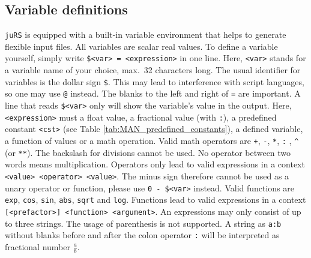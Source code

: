 \documentclass[12pt,BCOR8mm,noappendixprefix,nochapterprefix,bibtotoc,idxtotoc,openbib,tablecaptionabove]{scrbook}
\newcommand{\juRS}{\texttt{juRS}} %
\newcommand{\ttt}[1]{\texttt{#1}}
\begin{document}
\subsection{Variable definitions} \label{sec:MAN_variable_definitions}

\juRS{} is equipped with a built-in variable environment that helps to 
generate flexible input files. All variables are scalar real values. 
To define a variable yourself, simply write \ttt{\$<var> = <expression>} in one line. 
Here, \ttt{<var>} stands for a variable name of your choice, max.~32 characters long. 
The usual identifier for variables is the dollar sign \ttt{\$}. This may lead to 
interference with script languages, so one may use \ttt{@} instead. The blanks to the 
left and right of \ttt{=} are important. A line that reads \ttt{\$<var>} only will show 
the variable's value in the output. Here, \ttt{<expression>} must a float value, 
a fractional value (with \ttt{:}), a predefined constant \ttt{<cst>} 
(see Table \ref{tab:MAN_predefined_constants}), a defined variable, a function of 
values or a math operation. Valid math operators are 
\ttt{+}, \ttt{-}, \ttt{*}, \ttt{:} , \verb+^+ (or \verb+**+). 
The backslash for divisions cannot be used. No operator between two 
words means multiplication. Operators only lead to valid expressions in a 
context \ttt{<value> <operator> <value>}. The minus sign therefore cannot be 
used as a unary operator or function, please use \ttt{0 - \$<var>} instead. 
Valid functions are \ttt{exp}, \ttt{cos}, \ttt{sin}, \ttt{abs}, \ttt{sqrt} and \ttt{log}. 
Functions lead to valid expressions in a context \ttt{[<prefactor>] <function> <argument>}. 
An expressions may only consist of up to three strings. The usage of parenthesis is not supported. 
A string as \ttt{a:b} without blanks before and after the 
colon operator \ttt{:} will be interpreted as fractional number $\frac a b$.
\end{document}
